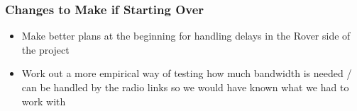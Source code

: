 \subsubsection{Changes to Make if Starting Over}
\begin{itemize}
\item Make better plans at the beginning for handling delays in the Rover side of the project
\item Work out a more empirical way of testing how much bandwidth is needed / can be handled by the radio links so we would have known what we had to work with
\end{itemize}
